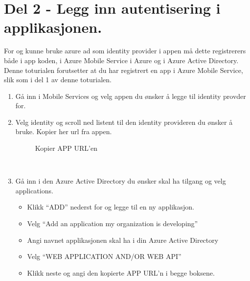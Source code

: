 \section{Del 2 - Legg inn autentisering i applikasjonen.}
For og kunne bruke azure ad som identity provider i appen må dette registrerers både i app koden, i Azure Mobile Service i Azure og i Azure Active Directory. Denne toturialen forutsetter at du har registrert en app i Azure Mobile Service, slik som i del 1 av denne toturialen.
\\
\begin{enumerate}
\item Gå inn i Mobile Services og velg appen du ønsker å legge til identity provder for. 
\\
\item Velg identity og scroll ned listent til den identity provideren du ønsker å bruke. Kopier her url fra appen. 
\\
\begin{figure}[H]
    \centering
    \setlength{\fboxsep}{0pt}%
    \setlength{\fboxrule}{1pt}%
    \caption{Kopier APP URL'en}
\end{figure}
\\
\item Gå inn i den Azure Active Directory du ønsker skal ha tilgang og velg applications.
\\
\begin{itemize}
\item Klikk “ADD” nederst for og legge til en ny applikasjon.
\item Velg “Add an application my organization is developing”
\item Angi navnet applikasjonen skal ha i din Azure Active Directory
\item Velg “WEB APPLICATION AND/OR WEB API”
\item Klikk neste og angi den kopierte APP URL’n i begge boksene. 
\end{itemize}
\bigskip




\end{enumerate}
